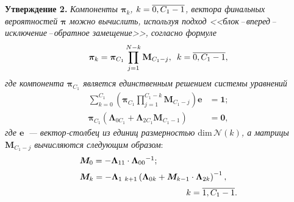 \begin{multicols}{2}
\noindent
\textbf{Утверждение 2.}
\label{utv_2}
\textit{Компоненты $\boldsymbol{\pi} _{k}$, $k\hm=\overline {0,{C_1} - 1}$, вектора 
финальных вероятностей $\boldsymbol{\pi}$ можно вы\-чис\-лить, используя подход 
<<блок\,--\,впе\-ред\,--\,исклю\-че\-ние\,--\,обрат\-ное замещение>>, согласно формуле}
\begin{equation*}
{{\boldsymbol{\pi }}_k} = {{\boldsymbol{\pi }}_{{C_1}}}\prod\limits_{j = 1}^{N - k}
{{{\mathbf{M}}_{{C_1} - j}}} ,\enskip k = \overline {0,{C_1} - 1},
\end{equation*}
\textit{где компонента $\boldsymbol{\pi} _{C_1}$ является единственным решением системы уравнений}
\begin{align*}
\sum\limits_{k = 0}^{{C_1}} \left( \boldsymbol{\pi }_{C_1}\prod\limits_{j =1}^{C_1 - k} 
\mathbf{M}_{{C_1} - j}  \right)\mathbf{e} &= \mathbf{1} ;\\
\boldsymbol{\pi }_{C_1}\left(\boldsymbol{\Lambda }_{0{C_1}} + \boldsymbol{\Lambda
}_{2{C_1}}{{\mathbf{M}}_{{C_1} - 1}}\right) &= \mathbf{0},
\end{align*}
\textit{где $\mathbf{e}$~--- вектор-стол\-бец из единиц размерностью $\mathrm{dim}\,\mathcal{N}(k)$,
 а матрицы~$\mathbf{M}_{C_1-j}$ вычисляются следующим образом}:
\begin{equation*} 
\begin{array}{l} 
{\boldsymbol{M}_{0}  = -\boldsymbol{\Lambda} _{11} \cdot \boldsymbol{\Lambda} _{00} {}^{-1} }; \\[6pt] 
\boldsymbol{M}_{k} =-\boldsymbol{\Lambda} _{1 \ k+1} \left(\boldsymbol{\Lambda} _{0k} +\boldsymbol{M}_{k-1}
 \cdot \boldsymbol{\Lambda} _{2k} \right)^{-1},\\[6pt]
\hspace*{44mm}k=\overline{1,C_1-1}.  
\end{array}
\end{equation*}

\begin{figure*}[b] %
\vspace*{-6pt}
 \begin{center}  
 \mbox{%
 \epsfxsize=163mm 
 }
\end{center}
\vspace*{-6pt}
    \label{fig_Ne}
\end{figure*}


\end{multicols}
